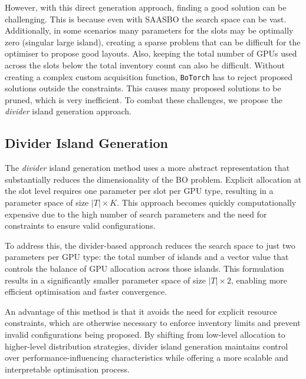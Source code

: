 However, with this direct generation approach, finding a good solution can be challenging.
This is because even with SAASBO the search space can be vast.
Additionally, in some scenarios many parameters for the slots may be optimally zero (singular large island), creating a sparse problem that can be difficult for the optimiser to propose good layouts.
Also, keeping the total number of GPUs used across the slots below the total inventory count can also be difficult.
Without creating a complex custom acquisition function, \texttt{BoTorch} has to reject proposed solutions outside the constraints.
This causes many proposed solutions to be pruned, which is very inefficient.
To combat these challenges, we propose the \textit{divider} island generation approach.

\subsection{Divider Island Generation}
\label{chap:island-divide}

The \textit{divider} island generation method uses a more abstract representation that substantially reduces the dimensionality of the BO problem.
Explicit allocation at the slot level requires one parameter per slot per GPU type, resulting in a parameter space of size \( |T| \times K \).
This approach becomes quickly computationally expensive due to the high number of search parameters and the need for constraints to ensure valid configurations.

To address this, the divider-based approach reduces the search space to just two parameters per GPU type: the total number of islands and a vector value that controls the balance of GPU allocation across those islands.
 This formulation results in a significantly smaller parameter space of size \( |T| \times 2 \), enabling more efficient optimisation and faster convergence.

An advantage of this method is that it avoids the need for explicit resource constraints, which are otherwise necessary to enforce inventory limits and prevent invalid configurations being proposed.
By shifting from low-level allocation to higher-level distribution strategies, divider island generation maintains control over performance-influencing characteristics while offering a more scalable and interpretable optimisation process.

